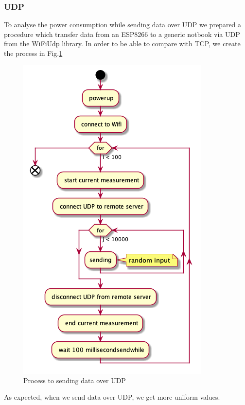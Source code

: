\subsubsection{UDP}
To analyse the power consumption while sending data over UDP we prepared a procedure which
transfer data from an ESP8266 to a generic notbook  via UDP from the WiFiUdp library.
In order to be able to compare with TCP, we create the process in Fig.\ref{fig:udp_uml}
\begin{figure}[h]
\centering
\includegraphics[width = 0.7 \linewidth]{fig/udp_tcp/udp_uml.png}
\caption{Process to sending data over UDP}
\label{fig:udp_uml}
\end{figure}
\newline\newline
As expected, when we send data over UDP, we get more uniform values.
\linebreak\linebreak
